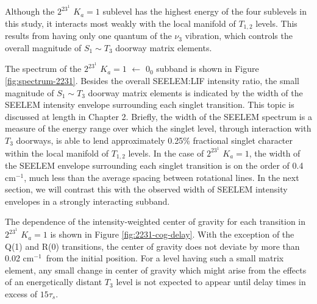 \documentclass[12pt]{mitthesis}
\newcommand{\rcm}{cm$^{-1}$}
\newcommand{\microsec}{$\mu$s}
\newcommand{\Ka}[1]{$K_a\!\!=\!#1$}
\begin{document}
Although the $2^23^1$ \Ka{1} sublevel has the highest energy of the
four sublevels in this study, it interacts most weakly with the local
manifold of $T_{1,2}$ levels.  This results from having only one
quantum of the $\nu_3$ vibration, which controls the overall magnitude
of $S_1 \sim T_3$ doorway matrix elements.

The spectrum of the $2^23^1$ \Ka{1} $\leftarrow$ $0_0$ subband is
shown in Figure \ref{fig:spectrum-2231}.  Besides the overall
SEELEM:LIF intensity ratio, the small magnitude of $S_1 \sim T_3$
doorway matrix elements is indicated by the width of the SEELEM
intensity envelope surrounding each singlet transition.  This topic is
discussed at length in Chapter 2.  Briefly, the width of the SEELEM
spectrum is a measure of the energy range over which the singlet
level, through interaction with $T_3$ doorways, is able to lend
approximately 0.25\% fractional singlet character within the local
manifold of $T_{1,2}$ levels.  In the case of $2^23^1$ \Ka{1}, the
width of the SEELEM envelope surrounding each singlet transition is on
the order of 0.4 \rcm, much less than the average spacing between
rotational lines.  In the next section, we will contrast this with the
observed width of SEELEM intensity envelopes in a strongly interacting
subband.


The dependence of the intensity-weighted center of gravity for each
transition in $2^23^1$ \Ka{1} is shown in Figure
\ref{fig:2231-cog-delay}.  With the exception of the Q(1) and R(0)
transitions, the center of gravity does not deviate by more than 0.02
\rcm\ from the initial position.  For a level having such a small
matrix element, any small change in center of gravity which might arise
from the effects of an energetically distant $T_3$ level is not
expected to appear until delay times in excess of $15\tau_s$.
\end{document}
